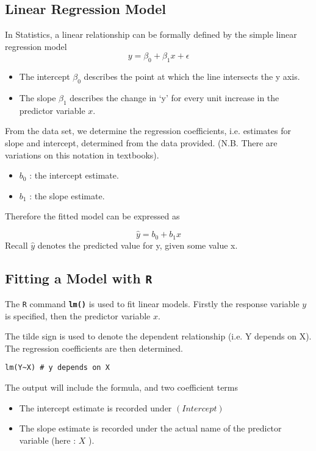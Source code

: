 \documentclass[a4paper,12pt]{article}
\begin{document}
\subsection{Linear Regression Model}

In Statistics, a linear relationship can be formally defined by the simple linear regression model
\[y = \beta_0 + \beta_1x + \epsilon\]
\begin{itemize}
\item The intercept $\beta_0$ describes the point at which the line intersects the y axis.
\item The slope $\beta_1$ describes the change in ‘y’ for every unit increase in the predictor variable $x$.
\end{itemize}
From the data set, we determine the regression coefficients, i.e. estimates for slope and intercept, determined from the data provided. (N.B. There are variations on this notation in textbooks).

\begin{itemize}	
\item $b_0$ : the intercept estimate.
\item	$b_1$ : the slope estimate.
\end{itemize}

Therefore the fitted model can be expressed as

\[ \hat{y} = b_0 + b_1x \]
Recall $\hat{y}$  denotes the predicted value for y, given some value x.

\subsection{Fitting a Model with \texttt{R}}

The  \texttt{R} command   \texttt{\textbf{lm()}} is used to fit linear models. Firstly the response variable $y$  is specified, then the predictor variable $x$.

The tilde sign is used to denote the dependent relationship (i.e. Y depends on X). The regression coefficients are then determined.

\begin{framed}
\begin{verbatim}
lm(Y~X) # y depends on X
\end{verbatim}
\end{framed}

The output will include the formula, and two coefficient terms
\begin{itemize}
\item The intercept estimate is recorded under $(Intercept)$
\item The slope estimate is recorded under the actual name of the predictor variable (here : $X$ ).
\end{itemize}	
	
\end{document}
